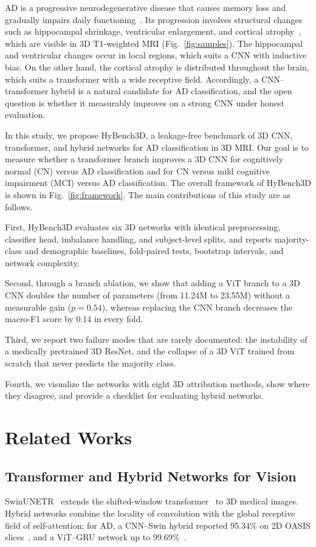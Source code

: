 \documentclass[conference,a4paper]{IEEEtran}
\begin{document}
AD is a progressive neurodegenerative disease that causes memory loss and gradually impairs daily functioning~\cite{scheltens2016alzheimer}. Its progression involves structural changes such as hippocampal shrinkage, ventricular enlargement, and cortical atrophy~\cite{frisoni2010clinical}, which are visible in 3D T1-weighted MRI (Fig.~\ref{fig:samples}). The hippocampal and ventricular changes occur in local regions, which suits a CNN with inductive bias. On the other hand, the cortical atrophy is distributed throughout the brain, which suits a transformer with a wide receptive field. Accordingly, a CNN--transformer hybrid is a natural candidate for AD classification, and the open question is whether it measurably improves on a strong CNN under honest evaluation.

In this study, we propose HyBench3D, a leakage-free benchmark of 3D CNN, transformer, and hybrid networks for AD classification in 3D MRI. Our goal is to measure whether a transformer branch improves a 3D CNN for cognitively normal (CN) versus AD classification and for CN versus mild cognitive impairment (MCI) versus AD classification. The overall framework of HyBench3D is shown in Fig.~\ref{fig:framework}. The main contributions of this study are as follows.

First, HyBench3D evaluates six 3D networks with identical preprocessing, classifier head, imbalance handling, and subject-level splits, and reports majority-class and demographic baselines, fold-paired tests, bootstrap intervals, and network complexity.

Second, through a branch ablation, we show that adding a ViT branch to a 3D CNN doubles the number of parameters (from 11.24M to 23.55M) without a measurable gain ($p=0.54$), whereas replacing the CNN branch decreases the macro-F1 score by 0.14 in every fold.

Third, we report two failure modes that are rarely documented: the instability of a medically pretrained 3D ResNet, and the collapse of a 3D ViT trained from scratch that never predicts the majority class.

Fourth, we visualize the networks with eight 3D attribution methods, show where they disagree, and provide a checklist for evaluating hybrid networks.

\section{Related Works}
\subsection{Transformer and Hybrid Networks for Vision}
SwinUNETR~\cite{hatamizadeh2021swinunetr} extends the shifted-window transformer~\cite{liu2021swin} to 3D medical images. Hybrid networks combine the locality of convolution with the global receptive field of self-attention; for AD, a CNN--Swin hybrid reported 95.34\% on 2D OASIS slices~\cite{velu2025design}, and a ViT--GRU network up to 99.69\%~\cite{mahim2024unlocking}.
\end{document}
